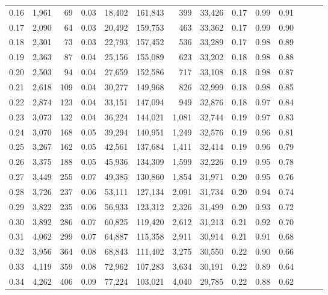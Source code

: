 \begin{tabular}{rrrrrrrrrrrrrr}
0.16 &  1,961 &   69 &  0.03 &   18,402 &  161,843 &     399 &  33,426 &  0.17 &  0.99 &      0.91 \\
0.17 &  2,090 &   64 &  0.03 &   20,492 &  159,753 &     463 &  33,362 &  0.17 &  0.99 &      0.90 \\
0.18 &  2,301 &   73 &  0.03 &   22,793 &  157,452 &     536 &  33,289 &  0.17 &  0.98 &      0.89 \\
0.19 &  2,363 &   87 &  0.04 &   25,156 &  155,089 &     623 &  33,202 &  0.18 &  0.98 &      0.88 \\
0.20 &  2,503 &   94 &  0.04 &   27,659 &  152,586 &     717 &  33,108 &  0.18 &  0.98 &      0.87 \\
0.21 &  2,618 &  109 &  0.04 &   30,277 &  149,968 &     826 &  32,999 &  0.18 &  0.98 &      0.85 \\
0.22 &  2,874 &  123 &  0.04 &   33,151 &  147,094 &     949 &  32,876 &  0.18 &  0.97 &      0.84 \\
0.23 &  3,073 &  132 &  0.04 &   36,224 &  144,021 &   1,081 &  32,744 &  0.19 &  0.97 &      0.83 \\
0.24 &  3,070 &  168 &  0.05 &   39,294 &  140,951 &   1,249 &  32,576 &  0.19 &  0.96 &      0.81 \\
0.25 &  3,267 &  162 &  0.05 &   42,561 &  137,684 &   1,411 &  32,414 &  0.19 &  0.96 &      0.79 \\
0.26 &  3,375 &  188 &  0.05 &   45,936 &  134,309 &   1,599 &  32,226 &  0.19 &  0.95 &      0.78 \\
0.27 &  3,449 &  255 &  0.07 &   49,385 &  130,860 &   1,854 &  31,971 &  0.20 &  0.95 &      0.76 \\
0.28 &  3,726 &  237 &  0.06 &   53,111 &  127,134 &   2,091 &  31,734 &  0.20 &  0.94 &      0.74 \\
0.29 &  3,822 &  235 &  0.06 &   56,933 &  123,312 &   2,326 &  31,499 &  0.20 &  0.93 &      0.72 \\
0.30 &  3,892 &  286 &  0.07 &   60,825 &  119,420 &   2,612 &  31,213 &  0.21 &  0.92 &      0.70 \\
0.31 &  4,062 &  299 &  0.07 &   64,887 &  115,358 &   2,911 &  30,914 &  0.21 &  0.91 &      0.68 \\
0.32 &  3,956 &  364 &  0.08 &   68,843 &  111,402 &   3,275 &  30,550 &  0.22 &  0.90 &      0.66 \\
0.33 &  4,119 &  359 &  0.08 &   72,962 &  107,283 &   3,634 &  30,191 &  0.22 &  0.89 &      0.64 \\
0.34 &  4,262 &  406 &  0.09 &   77,224 &  103,021 &   4,040 &  29,785 &  0.22 &  0.88 &      0.62 \\

\end{tabular}
